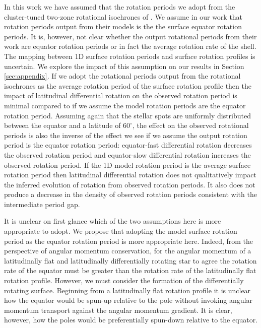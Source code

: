 In this work we have assumed that the rotation periods we adopt from the cluster-tuned two-zone rotational isochrones of \citep{spada_competing_2020}.
We assume in our work that rotation periods output from their models is the the surface equator rotation periods.
It is, however, not clear whether the output rotational periods from their work are equator rotation periods or in fact the average rotation rate of the shell.
The mapping between 1D surface rotation periods and surface rotation profiles is uncertain.
We explore the impact of this assumption on our results in Section \ref{sec:appendix}.
If we adopt the rotational periods output from the rotational isochrones as the average rotation period of the surface rotation profile then the impact of latitudinal differential rotation on the observed rotation period is minimal compared to if we assume the model rotation periods are the equator rotation period.
Assuming again that the stellar spots are uniformly distributed between the equator and a latitude of $60^{\circ}$, the effect on the observed rotational periods is also the inverse of the effect we see if we assume the output rotation period is the equator rotation period: equator-fast differential rotation decreases the observed rotation period and equator-slow differential rotation increases the observed rotation period.
If the 1D model rotation period is the average surface rotation period then latitudinal differential rotation does not qualitatively impact the inferred evolution of rotation from observed rotation periods.
It also does not produce a decrease in the density of observed rotation periods consistent with the intermediate period gap.

It is unclear on first glance which of the two assumptions here is more appropriate to adopt.
We propose that adopting the model surface rotation period as the equator rotation period is more appropriate here.
Indeed, from the perspective of angular momentum conservation, for the angular momentum of a latitudinally flat and latitudinally differentially rotating star to agree the rotation rate of the equator must be greater than the rotation rate of the latitudinally flat rotation profile.
However, we must consider the formation of the differentially rotating surface.
Beginning from a latitudinally flat rotation profile it is unclear how the equator would be spun-up relative to the pole without invoking angular momentum transport against the angular momentum gradient.
It is clear, however, how the poles would be preferentially spun-down relative to the equator.

